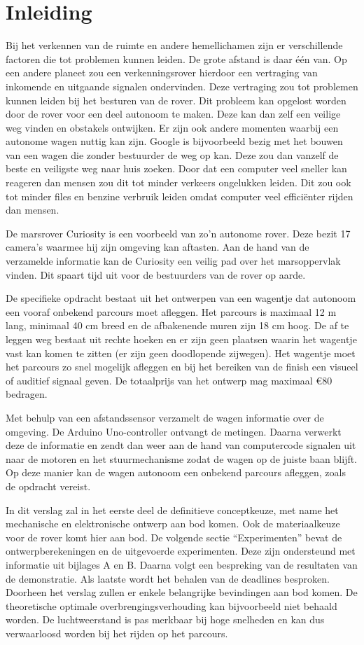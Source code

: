  
\section{Inleiding}
Bij het verkennen van de ruimte en andere hemellichamen zijn er verschillende 
factoren die tot problemen kunnen leiden. De grote afstand is daar één van. Op 
een andere planeet zou een verkenningsrover hierdoor een vertraging van 
inkomende en uitgaande signalen ondervinden. Deze vertraging zou tot problemen 
kunnen leiden bij het besturen van de rover. Dit probleem kan opgelost worden 
door de rover voor een deel autonoom te maken. Deze kan dan zelf een veilige weg 
vinden en obstakels ontwijken. Er zijn ook andere momenten waarbij een autonome 
wagen nuttig kan zijn. Google is bijvoorbeeld bezig met het bouwen van een wagen 
die zonder bestuurder de weg op kan. Deze zou dan vanzelf de beste en veiligste 
weg naar huis zoeken. Door dat een computer veel sneller kan reageren dan mensen
zou dit tot minder verkeers ongelukken leiden. Dit zou ook tot minder files en benzine
verbruik leiden omdat computer veel efficiënter rijden dan mensen. 

De marsrover Curiosity is een voorbeeld van zo’n autonome rover. Deze bezit 17 
camera's waarmee hij zijn omgeving kan aftasten. Aan de hand van de verzamelde 
informatie kan de Curiosity een veilig pad over het marsoppervlak vinden. Dit 
spaart tijd uit voor de bestuurders van de rover op aarde.\cite{NASACuriosity, 
NASA2013-259} 

De specifieke opdracht bestaat uit het ontwerpen van een wagentje dat autonoom 
een vooraf onbekend parcours moet afleggen. Het parcours is maximaal 12 m lang, 
minimaal 40 cm breed en de afbakenende muren zijn 18 cm hoog. De af te leggen 
weg bestaat uit rechte hoeken en er zijn geen plaatsen waarin het wagentje vast 
kan komen te zitten (er zijn geen doodlopende zijwegen). Het wagentje moet het 
parcours zo snel mogelijk afleggen en bij het bereiken van de finish een visueel 
of auditief signaal geven. De totaalprijs van het ontwerp mag maximaal \euro 80 
bedragen.

Met behulp van een afstandssensor verzamelt de wagen informatie over de 
omgeving. De Arduino Uno-controller ontvangt de metingen. Daarna verwerkt deze  
de informatie en zendt dan weer aan de hand van computercode signalen uit naar 
de motoren en het stuurmechanisme zodat de wagen op de juiste baan blijft. Op 
deze manier kan de wagen autonoom een onbekend parcours afleggen, zoals 
de opdracht vereist.

In dit verslag zal in het eerste deel de definitieve conceptkeuze, met name het 
mechanische en elektronische ontwerp aan bod komen. Ook de materiaalkeuze voor 
de rover komt hier aan bod. De volgende sectie “Experimenten” bevat de 
ontwerpberekeningen en de uitgevoerde experimenten. Deze zijn ondersteund met 
informatie uit bijlages A en B. Daarna volgt een bespreking van de resultaten 
van de demonstratie. Als laatste wordt het behalen van de deadlines besproken.
Doorheen het verslag zullen er enkele belangrijke bevindingen aan bod komen. De 
theoretische optimale overbrengingsverhouding kan bijvoorbeeld niet behaald 
worden. De luchtweerstand is pas merkbaar bij hoge snelheden en kan dus 
verwaarloosd worden bij het rijden op het parcours.  
